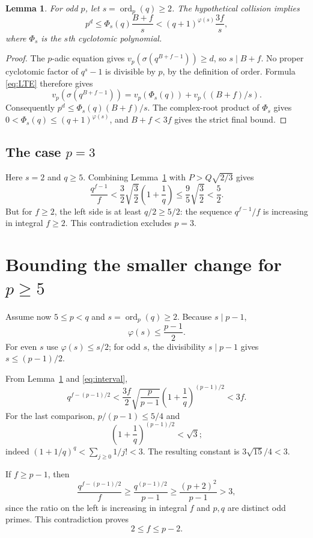\documentclass[11pt]{article}
\newtheorem{lemma}[theorem]{Lemma}
\DeclareMathOperator{\ord}{ord}
\begin{document}
\begin{lemma}\label{lem:cyclobound}
For odd $p$, let $s=\ord_p(q)\ge2$. The hypothetical collision implies
\[
 \boxed{p^d\le\Phi_s(q)\frac{B+f}{s}
 <(q+1)^{\varphi(s)}\frac{3f}{s},}
\]
where $\Phi_s$ is the $s$th cyclotomic polynomial.
\end{lemma}
\begin{proof}
The $p$-adic equation gives $v_p(\sigma(q^{B+f-1}))\ge d$, so $s\mid B+f$. No proper cyclotomic factor of $q^s-1$ is divisible by $p$, by the definition of order. Formula \eqref{eq:LTE} therefore gives
\[
 v_p(\sigma(q^{B+f-1}))
 =v_p(\Phi_s(q))+v_p((B+f)/s).
\]
Consequently $p^d\le\Phi_s(q)(B+f)/s$. The complex-root product of $\Phi_s$ gives $0<\Phi_s(q)\le(q+1)^{\varphi(s)}$, and $B+f<3f$ gives the strict final bound.
\end{proof}

\subsection*{The case $p=3$}
Here $s=2$ and $q\ge5$. Combining Lemma~\ref{lem:cyclobound} with $P>Q\sqrt{2/3}$ gives
\[
 \frac{q^{f-1}}{f}
 <\frac32\sqrt{\frac32}\left(1+\frac1q\right)
 \le\frac95\sqrt{\frac32}<\frac52.
\]
But for $f\ge2$, the left side is at least $q/2\ge5/2$: the sequence $q^{f-1}/f$ is increasing in integral $f\ge2$. This contradiction excludes $p=3$.

\section{Bounding the smaller change for \texorpdfstring{$p\ge5$}{p at least 5}}
Assume now $5\le p<q$ and $s=\ord_p(q)\ge2$. Because $s\mid p-1$,
\[
 \varphi(s)\le\frac{p-1}{2}.
\]
For even $s$ use $\varphi(s)\le s/2$; for odd $s$, the divisibility $s\mid p-1$ gives $s\le(p-1)/2$.

From Lemma~\ref{lem:cyclobound} and \eqref{eq:interval},
\[
 q^{f-(p-1)/2}
 <\frac{3f}{2}\sqrt{\frac p{p-1}}
 \left(1+\frac1q\right)^{(p-1)/2}<3f.
\]
For the last comparison, $p/(p-1)\le5/4$ and
\[
 \left(1+\frac1q\right)^{(p-1)/2}<\sqrt3;
\]
indeed $(1+1/q)^q<\sum_{j\ge0}1/j!<3$. The resulting constant is $3\sqrt{15}/4<3$.

If $f\ge p-1$, then
\[
 \frac{q^{f-(p-1)/2}}{f}
 \ge\frac{q^{(p-1)/2}}{p-1}
 \ge\frac{(p+2)^2}{p-1}>3,
\]
since the ratio on the left is increasing in integral $f$ and $p,q$ are distinct odd primes. This contradiction proves
\begin{equation}\label{eq:fbound}
 \boxed{2\le f\le p-2.}
\end{equation}
\end{document}
